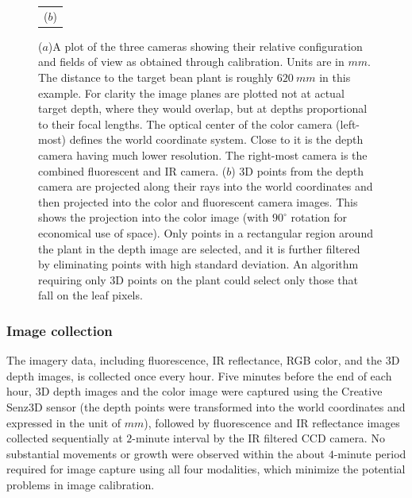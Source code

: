\begin{figure}
\begin{tabular}{c}
  ($b$)\\
\end{tabular}
\caption{($a$)A plot of the three cameras showing their relative configuration and fields of view as obtained through calibration.  Units are in $mm$. The distance to the target bean plant is roughly $620~mm$ in this example. For clarity the image planes are plotted not at actual target depth, where they would overlap, but at depths proportional to their focal lengths. The optical center of the color camera (left-most) defines the world coordinate system.  Close to it is the depth camera having much lower resolution.  The right-most camera is the combined fluorescent and IR camera. ($b$) $3$D points from the depth camera are projected along their rays into the world coordinates and then projected into the color and fluorescent camera images.  This shows the projection into the color image (with $90^{\circ}$ rotation for economical use of space).  Only points in a rectangular region around the plant in the depth image are selected, and it is further filtered by eliminating points with high standard deviation.  An algorithm requiring only $3$D points on the plant could select only those that fall on the leaf pixels.}
\label{fig:CameraConfiguration}
\end{figure}


\subsubsection{Image collection}
The imagery data, including fluorescence, IR reflectance, RGB color, and the $3$D depth images, is collected once every hour.
Five minutes before the end of each hour, $3$D depth images and the color image were captured using the Creative Senz3D sensor (the depth points were transformed into the world coordinates and expressed in the unit of $mm$), followed by fluorescence and IR reflectance images collected sequentially at $2$-minute interval by the IR filtered CCD camera.
No substantial movements or growth were observed within the about $4$-minute period required for image capture using all four modalities, which minimize the potential problems in image calibration.

%

